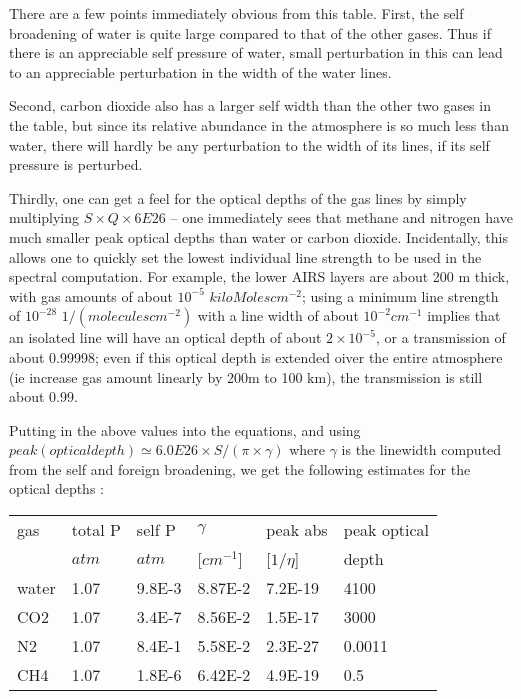 \documentclass[11pt]{article}
\begin{document}
There are a few points immediately obvious from this table. First, the 
self broadening of water is quite large compared to that of the other 
gases. Thus if there is an appreciable self pressure of water,  small 
perturbation in this can lead to an appreciable perturbation in the width of 
the water lines. 

Second, carbon dioxide also has a larger self width than the other two gases
in the table, but since its relative abundance in the atmosphere is so much
less than water, there will hardly be any perturbation to the width of
its lines, if its self pressure is perturbed. 

Thirdly, one can get a feel 
for the optical depths of the gas lines by simply multiplying $S \times Q
\times 6E26$ -- one immediately sees that methane and nitrogen have much 
smaller peak optical depths than water or carbon dioxide. Incidentally, 
this allows one to quickly set the lowest individual line strength to be 
used in the spectral computation. For example, the lower AIRS layers are 
about  200 m thick, with gas amounts of about $10^{-5}$ 
$kiloMolescm^{-2}$; using a minimum line strength of $10^{-28}$ 
$1/(moleculescm^{-2})$ with a line width of about $10^{-2} cm^{-1}$ 
implies that an isolated line will have an optical depth of about
$2 \times 10^{-5}$, or a transmission of about 0.99998; even if this 
optical depth is extended oiver the entire atmosphere (ie increase gas amount
linearly by 200m to 100 km), the transmission is still about 0.99.

Putting in the above values into the equations, and 
using $peak(optical depth) \simeq 6.0E26 \times S/(\pi \times \gamma)$ 
where $\gamma$ is the linewidth computed from the self and foreign 
broadening, we get the following estimates for the optical depths : 

\begin{longtable}{llllll} 
gas & total P & self P & $\gamma$   & peak abs   & peak optical \\
    & $atm$   & $atm$  & [$cm^{-1}$] & [$1/\eta$] & depth \\
\hline
water & 1.07 & 9.8E-3 & 8.87E-2 & 7.2E-19 & 4100 \\
CO2   & 1.07 & 3.4E-7 & 8.56E-2 & 1.5E-17 & 3000 \\
N2    & 1.07 & 8.4E-1 & 5.58E-2 & 2.3E-27 & 0.0011\\
CH4   & 1.07 & 1.8E-6 & 6.42E-2 & 4.9E-19 & 0.5\\
\hline 
\end{longtable} 
 
\end{document}
